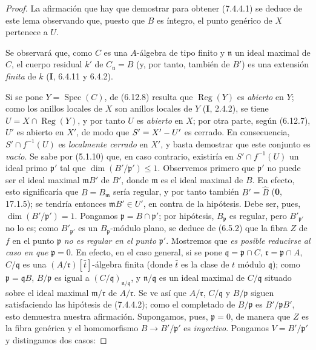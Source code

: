 \begin{proof}
La afirmación que hay que demostrar para obtener (7.4.4.1) se deduce
de este lema observando que, puesto que $B$ es íntegro, el punto
genérico de $X$ pertenece a $U$.

Se observará que, como $C$ es una $A$-álgebra de tipo finito y $\mathfrak n$
un ideal maximal de $C$, el cuerpo residual $k'$ de
$C_{\mathfrak n}=B$ (y, por tanto, también de $B'$) es una extensión
\emph{finita} de $k$ (\textbf I, 6.4.11 y 6.4.2).

Si se pone $Y=\operatorname{Spec}(C)$, de (6.12.8) resulta que
$\operatorname{Reg}(Y)$ es \emph{abierto} en $Y$; como los anillos locales de
$X$ son anillos locales de $Y$ (\textbf I, 2.4.2), se tiene
$U=X\cap\operatorname{Reg}(Y)$, y por tanto $U$ es \emph{abierto} en $X$; por
otra parte, según (6.12.7), $U'$ es abierto en $X'$, de modo que
$S'=X'- U'$ es cerrado. En consecuencia, $S'\cap f^{-1}(U)$ es
\emph{localmente cerrado} en $X'$, y basta demostrar que este conjunto es
\emph{vacío}. Se sabe por (5.1.10) que, en caso contrario, existiría en
$S'\cap f^{-1}(U)$ un ideal primo $\mathfrak p'$ tal que
$\dim(B'/\mathfrak p')\leqslant1$. Observemos primero que
$\mathfrak p'$ no puede ser el ideal maximal $\mathfrak mB'$ de $B'$,
donde $\mathfrak m$ es el ideal maximal de $B$. En efecto, esto
significaría que $B=B_{\mathfrak m}$ sería regular, y por tanto también
$B'=\widehat B$ (\textbf{0}, 17.1.5); se tendría entonces $\mathfrak mB'\in U'$,
en contra de la hipótesis. Debe ser, pues,
$\dim(B'/\mathfrak p')=1$. Pongamos
$\mathfrak p=B\cap\mathfrak p'$; por hipótesis, $B_{\mathfrak p}$ es
regular, pero $B'_{\mathfrak p'}$ no lo es; como
$B'_{\mathfrak p'}$ es un $B_{\mathfrak p}$-módulo plano, se deduce de
(6.5.2) que la fibra $Z$ de $f$ en el punto $\mathfrak p$ \emph{no es regular
en el punto} $\mathfrak p'$. Mostremos que \emph{es posible reducirse al caso en
que} $\mathfrak p=0$. En efecto, en el caso general, si se pone
$\mathfrak q=\mathfrak p\cap C$, $\mathfrak r=\mathfrak p\cap A$,
$C/\mathfrak q$ es una $(A/\mathfrak r)[\bar t]$-álgebra finita (donde
$\bar t$ es la clase de $t$ módulo $\mathfrak q$); como
$\mathfrak p=\mathfrak qB$, $B/\mathfrak p$ es igual a
$(C/\mathfrak q)_{\mathfrak n/\mathfrak q}$, y
$\mathfrak n/\mathfrak q$ es un ideal maximal de $C/\mathfrak q$
situado sobre el ideal maximal $\mathfrak m/\mathfrak r$ de
$A/\mathfrak r$. Se ve así que $A/\mathfrak r$, $C/\mathfrak q$ y
$B/\mathfrak p$ siguen satisfaciendo las hipótesis de (7.4.4.2); como
el completado de $B/\mathfrak p$ es $B'/\mathfrak pB'$, esto demuestra
nuestra afirmación. Supongamos, pues, $\mathfrak p=0$, de manera que
$Z$ es la fibra genérica y el homomorfismo $B\to B'/\mathfrak p'$ es
\emph{inyectivo}. Pongamos $V=B'/\mathfrak p'$ y distingamos dos casos:


\end{proof}
